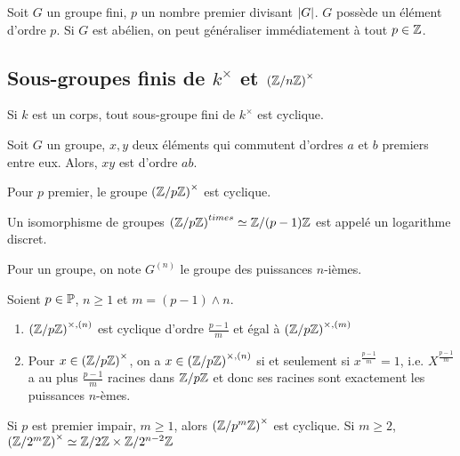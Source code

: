 \documentclass{cours}
\begin{document}
\begin{theorem}[Cauchy]
    Soit $G$ un groupe fini, $p$ un nombre premier divisant $\abs{G}$. $G$ possède un élément d'ordre $p$. Si $G$ est abélien, on peut généraliser immédiatement à tout $p \in \Z$.
\end{theorem}

\subsection{Sous-groupes finis de $k^{\times}$ et $\left(\Z/n\Z\right)^{\times}$}
\begin{theorem}
    Si $k$ est un corps, tout sous-groupe fini de $k^{\times}$ est cyclique.
\end{theorem}
\begin{lemma}[Cauchy]
    Soit $G$ un groupe, $x, y$ deux éléments qui commutent d'ordres $a$ et $b$ premiers entre eux. Alors, $xy$ est d'ordre $ab$.
\end{lemma}
\begin{theorem}[Gauss]
    Pour $p$ premier, le groupe $\left(\Z/p\Z\right)^{\times}$ est cyclique.
\end{theorem}
\begin{definition}
    Un isomorphisme de groupes $\left(\Z/p\Z\right)^{times} \simeq \Z/(p-1)\Z$ est appelé un logarithme discret.
\end{definition}
\begin{definition}
    Pour un groupe, on note $G^{(n)}$ le groupe des puissances $n$-ièmes.
\end{definition}
\begin{proposition}
    Soient $p\in\P$, $n\geq 1$ et $m = (p-1)\wedge n$.
    \begin{enumerate}
        \item $\left(\Z/p\Z\right)^{\times, (n)}$ est cyclique d'ordre $\frac{p - 1}{m}$ et égal à $\left(\Z/p\Z\right)^{\times, (m)}$
        \item Pour $x \in \left(\znz{p}\right)^{\times}$, on a $x \in \left(\znz{p}\right)^{\times, (n)}$ si et seulement si $x^{\frac{p-1}{m}} = 1$, i.e. $X^{\frac{p-1}{m}}$ a au plus $\frac{p-1}{m}$ racines dans $\znz{p}$ et donc ses racines sont exactement les puissances $n$-èmes.
    \end{enumerate}
\end{proposition}

\begin{proposition}
    Si $p$ est premier impair, $m \geq 1$, alors $\left(\znz{p^{m}}\right)^{\times}$ est cyclique. Si $m\geq 2$, $\left(\znz{2^{m}}\right)^{\times} \simeq \znz{2} \times \znz{2^{n-2}}$
\end{proposition}
\end{document}
